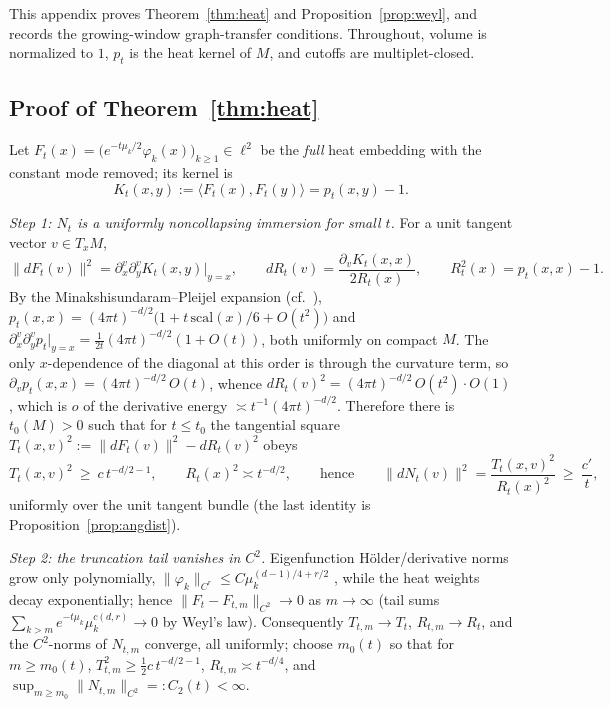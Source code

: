 \documentclass[11pt]{article}
\theoremstyle{remark}
\begin{document}
This appendix proves Theorem~\ref{thm:heat} and Proposition~\ref{prop:weyl},
and records the growing-window graph-transfer conditions. Throughout, volume
is normalized to $1$, $p_t$ is the heat kernel of $M$, and cutoffs are
multiplet-closed.

\subsection*{Proof of Theorem~\ref{thm:heat}}
Let $F_t(x)=\big(e^{-t\mu_k/2}\varphi_k(x)\big)_{k\ge1}\in\ell^2$ be the
\emph{full} heat embedding with the constant mode removed; its kernel is
\[
K_t(x,y):=\langle F_t(x),F_t(y)\rangle=p_t(x,y)-1 .
\]

\emph{Step 1: $N_t$ is a uniformly noncollapsing immersion for small $t$.}
For a unit tangent vector $v\in T_xM$,
\[
\lVert dF_t(v)\rVert^2=\partial^v_x\partial^v_y K_t(x,y)\big|_{y=x},
\qquad
dR_t(v)=\frac{\partial_v K_t(x,x)}{2R_t(x)},
\qquad R_t^2(x)=p_t(x,x)-1 .
\]
By the Minakshisundaram--Pleijel expansion (cf.\ \cite{berard1994}),
$p_t(x,x)=(4\pi t)^{-d/2}\big(1+t\,\mathrm{scal}(x)/6+O(t^2)\big)$ and
$\partial^v_x\partial^v_y p_t\big|_{y=x}=\tfrac1{2t}(4\pi t)^{-d/2}(1+O(t))$,
both uniformly on compact $M$. The only $x$-dependence of the diagonal at this
order is through the curvature term, so
$\partial_v p_t(x,x)=(4\pi t)^{-d/2}\,O(t)$, whence
$dR_t(v)^2=(4\pi t)^{-d/2}\,O(t^{2})\cdot O(1)$, which is $o$ of the
derivative energy $\asymp t^{-1}(4\pi t)^{-d/2}$. Therefore there is
$t_0(M)>0$ such that for $t\le t_0$ the tangential square
$T_t(x,v)^2:=\lVert dF_t(v)\rVert^2-dR_t(v)^2$ obeys
\[
T_t(x,v)^2\ \ge\ c\,t^{-d/2-1},\qquad
R_t(x)^2\asymp t^{-d/2},\qquad\text{hence}\qquad
\lVert dN_t(v)\rVert^2=\frac{T_t(x,v)^2}{R_t(x)^2}\ \ge\ \frac{c'}{t},
\]
uniformly over the unit tangent bundle (the last identity is
Proposition~\ref{prop:angdist}).

\emph{Step 2: the truncation tail vanishes in $C^2$.} Eigenfunction
H\"older/derivative norms grow only polynomially,
$\lVert\varphi_k\rVert_{C^r}\le C\mu_k^{(d-1)/4+r/2}$ \cite{hormander1968},
while the heat weights decay exponentially; hence
$\lVert F_t-F_{t,m}\rVert_{C^2}\to0$ as $m\to\infty$ (tail sums
$\sum_{k>m}e^{-t\mu_k}\mu_k^{c(d,r)}\to0$ by Weyl's law). Consequently
$T_{t,m}\to T_t$, $R_{t,m}\to R_t$, and the $C^2$-norms of $N_{t,m}$ converge,
all uniformly; choose $m_0(t)$ so that for $m\ge m_0(t)$,
$T_{t,m}^2\ge\tfrac12c\,t^{-d/2-1}$, $R_{t,m}\asymp t^{-d/4}$, and
$\sup_{m\ge m_0}\lVert N_{t,m}\rVert_{C^2}=:C_2(t)<\infty$.
\end{document}
